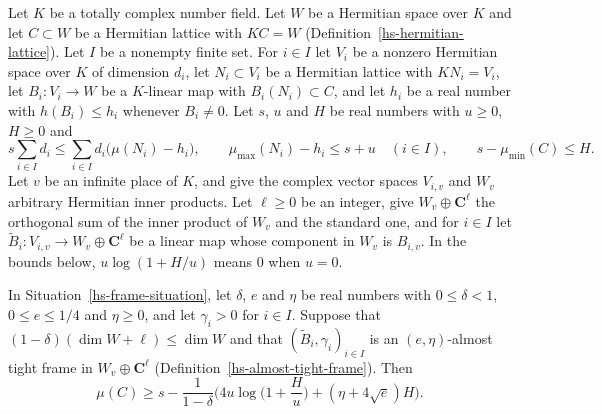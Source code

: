 \begin{situation}\label{hs-frame-situation}
Let $K$ be a totally complex number field. Let $W$ be a Hermitian space over $K$ and let
$C\subset W$ be a Hermitian lattice with $KC=W$ (Definition~\ref{hs-hermitian-lattice}). Let $I$
be a nonempty finite set. For $i\in I$ let $V_i$ be a nonzero Hermitian space over $K$ of
dimension $d_i$, let $N_i\subset V_i$ be a Hermitian lattice with $KN_i=V_i$, let
$B_i:V_i\to W$ be a $K$-linear map with $B_i(N_i)\subset C$, and let $h_i$ be a real number with
$h(B_i)\leq h_i$ whenever $B_i\neq0$. Let $s$, $u$ and $H$ be real numbers with $u\geq0$,
$H\geq0$ and
\[
 s\sum_{i\in I}d_i\leq\sum_{i\in I}d_i\big(\mu(N_i)-h_i\big),\qquad
 \mu_{\max}(N_i)-h_i\leq s+u\quad(i\in I),\qquad
 s-\mu_{\min}(C)\leq H .
\]
Let $v$ be an infinite place of $K$, and give the complex vector spaces $V_{i,v}$ and $W_v$
arbitrary Hermitian inner products. Let $\ell\geq0$ be an integer, give
$W_v\oplus\mathbf C^\ell$ the orthogonal sum of the inner product of $W_v$ and the standard one,
and for $i\in I$ let $\tilde B_i:V_{i,v}\to W_v\oplus\mathbf C^\ell$ be a linear map whose
component in $W_v$ is $B_{i,v}$. In the bounds below, $u\log(1+H/u)$ means $0$ when $u=0$.
\end{situation}

\begin{theorem}\label{hs-frame-slope-inequality-sharp}
In Situation~\ref{hs-frame-situation}, let $\delta$, $e$ and $\eta$ be real numbers with
$0\leq\delta<1$, $0\leq e\leq1/4$ and $\eta\geq0$, and let $\gamma_i>0$ for $i\in I$. Suppose
that $(1-\delta)(\dim W+\ell)\leq\dim W$ and that $(\tilde B_i,\gamma_i)_{i\in I}$ is an
$(e,\eta)$-almost tight frame in $W_v\oplus\mathbf C^\ell$
(Definition~\ref{hs-almost-tight-frame}). Then
\[
 \mu(C)\geq s-\frac1{1-\delta}\Big(4u\log\Big(1+\frac Hu\Big)+(\eta+4\sqrt e)H\Big).
\]
\end{theorem}

